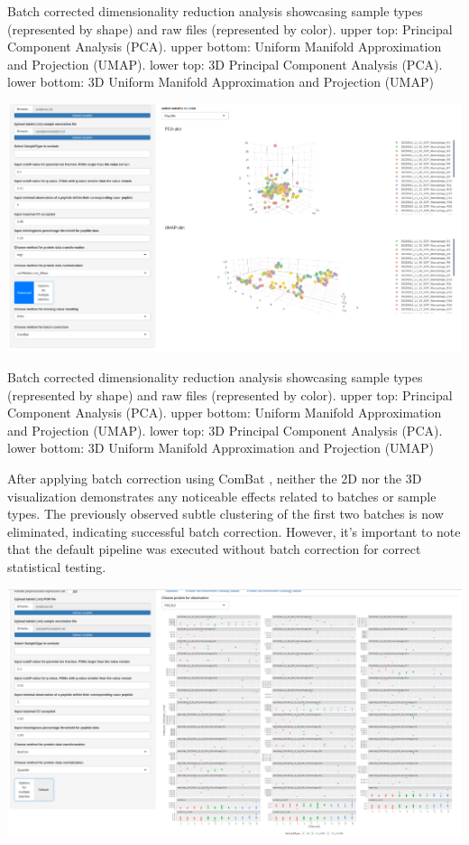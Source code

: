 \documentclass[
  11pt,
]{article}
\let\origfigure\figure
\begin{document}
\caption{Batch corrected dimensionality reduction analysis showcasing sample types (represented by shape) and raw files (represented by color). upper top: Principal Component Analysis (PCA). upper bottom: Uniform Manifold Approximation and Projection (UMAP). lower top: 3D Principal Component Analysis (PCA). lower bottom: 3D Uniform Manifold Approximation and Projection (UMAP)}\label{fig:ui_dim_red_batchC-1}
 \endfigure\egroup 
\bgroup  \origfigure[H] 

{\centering \includegraphics[width=1\linewidth]{screenshots/dim_red_batchC_3d} 

}

\caption{Batch corrected dimensionality reduction analysis showcasing sample types (represented by shape) and raw files (represented by color). upper top: Principal Component Analysis (PCA). upper bottom: Uniform Manifold Approximation and Projection (UMAP). lower top: 3D Principal Component Analysis (PCA). lower bottom: 3D Uniform Manifold Approximation and Projection (UMAP)}\label{fig:ui_dim_red_batchC-2}
 \endfigure\egroup

After applying batch correction using ComBat \citep{Leek2012}, neither
the 2D nor the 3D visualization demonstrates any noticeable effects
related to batches or sample types. The previously observed subtle
clustering of the first two batches is now eliminated, indicating
successful batch correction. However, it's important to note that the
default pipeline was executed without batch correction for correct
statistical testing.

\newpage
\bgroup  \origfigure[H] 

{\centering \includegraphics[width=1\linewidth]{screenshots/feature} 

}
\end{document}
